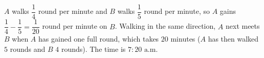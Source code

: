 $A$ walks $\dfrac{1}{4}$ round per minute and $B$ walks $\dfrac{1}{5}$ round per minute, so $A$ gains $\dfrac{1}{4}-\dfrac{1}{5}=\dfrac{1}{20}$ round per minute on $B$. Walking in the same direction, $A$ next meets $B$ when $A$ has gained one full round, which takes $20$ minutes ($A$ has then walked $5$ rounds and $B$ $4$ rounds). The time is $\boxed{7{:}20\text{ a.m.}}$
